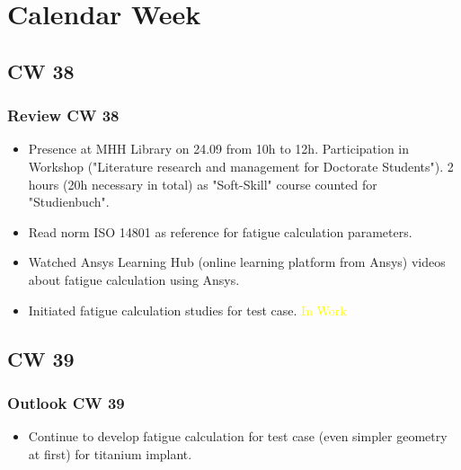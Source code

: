 \section{Calendar Week}
\subsection{CW 38}
\begin{frame}
  \frametitle{Review CW 38}
	\begin{itemize}
		\item Presence at MHH Library on 24.09 from 10h to 12h. Participation in Workshop ("Literature research and management for Doctorate Students"). 2 hours (20h necessary in total) as "Soft-Skill" course counted for "Studienbuch".
		\item Read norm ISO 14801 as reference for fatigue calculation parameters.
		\item Watched Ansys Learning Hub (online learning platform from Ansys) videos about fatigue calculation using Ansys.
		\item Initiated fatigue calculation studies for test case. \textcolor{yellow}{In Work}
	\end{itemize}
\end{frame}

\subsection{CW 39}
\begin{frame}
  \frametitle{Outlook CW 39}
	\begin{itemize}
		\item Continue to develop fatigue calculation for test case (even simpler geometry at first) for titanium implant. 
	\end{itemize}
\end{frame}

